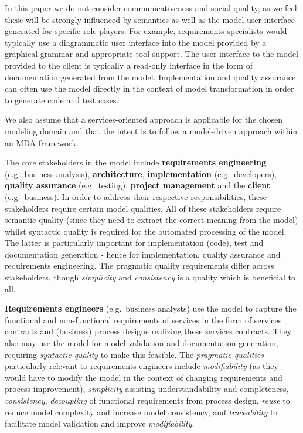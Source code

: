 In this paper we do not consider communicativeness and social quality, as we feel these will be strongly influenced by semantics as well as the model user interface generated for specific role players. For example, requirements specialists would typically use a diagrammatic user interface into the model provided by a graphical grammar and appropriate tool support. The user interface to the model provided to the client is typically a read-only interface in the form of documentation generated from the model. Implementation and quality assurance can often use the model directly in the context of model transformation in order to generate code and test cases.

We also assume that a services-oriented approach is applicable for the chosen modeling domain and that the intent is to follow a model-driven approach within an MDA framework.

The core stakeholders in the model include {\bf requirements engineering} (e.g.\ business analysis), {\bf architecture}, {\bf implementation} (e.g.\ developers), {\bf quality assurance} (e.g.\ testing), {\bf project management} and the {\bf client} (e.g.\ business). In order to address their respective responsibilities, these stakeholders require certain model qualities. All of these stakeholders require semantic quality (since they need to extract the correct meaning from the model) whilst syntactic quality is required for the automated processing of the model. The latter is particularly important for implementation (code), test and documentation generation - hence for implementation, quality assurance and requirements engineering. The pragmatic quality requirements differ across stakeholders, though \emph{simplicity} and \emph{consistency} is a quality which is beneficial to all.

{\bf Requirements engineers} (e.g.\ business analysts) use the model to capture the functional and non-functional requirements of services in the form of services contracts and (business) process designs realizing these services contracts. They also may use the model for model validation and documentation generation, requiring \emph{syntactic quality} to make this feasible.  The \emph{pragmatic qualities} particularly relevant to requirements engineers include \emph{modifiability} (as they would have to modify the model in the context of changing requirements and process improvement), \emph{simplicity} assisting understandability and completeness, \emph{consistency}, \emph{decoupling} of functional requirements from process design, \emph{reuse} to reduce model complexity and increase model consistency, and \emph{traceability} to facilitate model validation and improve \emph{modifiability}. 

